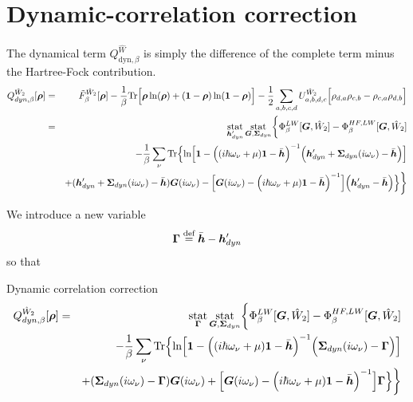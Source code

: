 \documentclass[11pt,a4paper]{report}
\begin{document}
\section{Dynamic-correlation correction}
\label{sec:dyncorelcorr}
The dynamical term
$Q_{\text{dyn},\beta}^{\hat{W}}$
is simply the difference of the complete term minus the Hartree-Fock
contribution.
\begin{eqnarray}
Q^{\hat{W}_2}_{dyn,\beta}[\bm{\rho}]
&=&\tilde{F}^{\hat{W}_2}_\beta[\bm{\rho}]
-
\frac{1}{\beta}\mathrm{Tr}\Bigl[
\bm{\rho}\ln(\bm{\rho})+(\bm{1}-\bm{\rho})\ln(\bm{1}-\bm{\rho})\Bigr]
-
\frac{1}{2}\sum_{a,b,c,d}U^{\hat{W}_2}_{a,b,d,c}
\Bigl[\rho_{d,a}\rho_{c,b}-\rho_{c,a}\rho_{d,b}\Bigr]
\nonumber\\
&=&
\operatorname*{stat}_{\bm{h}'_{dyn}}\operatorname*{stat}_{\bm{G},\bm{\Sigma}_{dyn}}
\biggl\lbrace
\Phi^{LW}_\beta[\bm{G},\hat{W}_2]-\Phi^{HF,LW}_\beta[\bm{G},\hat{W}_2]
\nonumber\\
&&-\frac{1}{\beta}\sum_\nu\mathrm{Tr}\Bigl\lbrace
\ln\Bigl[
\bm{1}-
\Bigl((i\hbar\omega_\nu+\mu)\bm{1}-\bar{\bm{h}}\Bigr)^{-1}
\Bigl(\bm{h}'_{dyn}+\bm{\Sigma}_{dyn}(i\omega_\nu)-\bar{\bm{h}}\Bigr)
\Bigr]
\nonumber\\&&
+(\bm{h}'_{dyn}+\bm{\Sigma}_{dyn}(i\omega_\nu)-\bar{\bm{h}})\bm{G}(i\omega_\nu)
-
\Bigl[
\bm{G}(i\omega_\nu)
-\Bigl(i\hbar\omega_\nu+\mu)\bm{1}-\bar{\bm{h}}\Bigr)^{-1}
\Bigr]
\Bigl(\bm{h}'_{dyn}-\bar{\bm{h}}\Bigr)\Bigr\rbrace
\biggr\rbrace
\nonumber\\
\label{eq:dmf1greena}
\end{eqnarray}

We introduce a new variable
\begin{eqnarray}
\bm{\Gamma}\stackrel{\text{def}}{=}\bar{\bm{h}}-\bm{h}'_{dyn}
\end{eqnarray}
so that

\begin{myshadowminipage}{Dynamic correlation correction}
\begin{eqnarray}
Q^{\hat{W}_2}_{dyn,\beta}[\bm{\rho}]
&=&
\operatorname*{stat}_{\bm{\Gamma}}\operatorname*{stat}_{\bm{G},\bm{\Sigma}_{dyn}}
\biggl\lbrace
\Phi^{LW}_\beta[\bm{G},\hat{W}_2]-\Phi^{HF,LW}_\beta[\bm{G},\hat{W}_2]
\nonumber\\
&&-\frac{1}{\beta}\sum_\nu\mathrm{Tr}\Bigl\lbrace
\ln\Bigl[
\bm{1}-
\Bigl((i\hbar\omega_\nu+\mu)\bm{1}-\bar{\bm{h}}\Bigr)^{-1}
\Bigl(\bm{\Sigma}_{dyn}(i\omega_\nu)-\bm{\Gamma}\Bigr)
\Bigr]
\nonumber\\&&
+(\bm{\Sigma}_{dyn}(i\omega_\nu)-\bm{\Gamma})\bm{G}(i\omega_\nu)
+
\Bigl[
\bm{G}(i\omega_\nu)
-\Bigl(i\hbar\omega_\nu+\mu)\bm{1}-\bar{\bm{h}}\Bigr)^{-1}
\Bigr]
\bm{\Gamma}\Bigr\rbrace
\biggr\rbrace
\nonumber\\
\label{eq:dmf1green}
\end{eqnarray}
\end{myshadowminipage}
\end{document}
